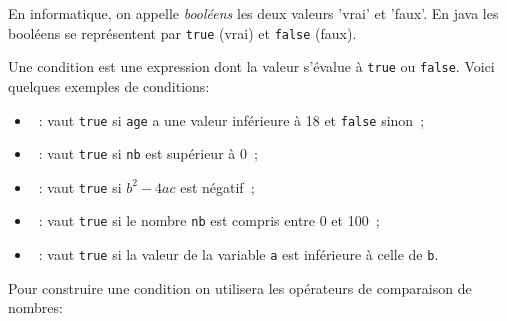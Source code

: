 \documentclass[a4paper,11pt]{article}
\begin{document}
	En informatique, on appelle \emph{booléens} les deux valeurs 'vrai' et 'faux'. 
	En java les booléens se représentent par \texttt{true} (vrai) et \texttt{false} (faux).  

	Une condition est une expression dont la valeur s'évalue à \texttt{true} ou \texttt{false}.
	Voici quelques exemples de conditions:
	\begin{itemize}
		\item {}~:  vaut \texttt{true} si \texttt{age} a une valeur inférieure à 18 et \texttt{false} sinon~;
		\item {}~:  vaut \texttt{true} si \texttt{nb} est supérieur à 0~;
		\item {}~: vaut \texttt{true} si $b^2-4ac$ est négatif~;
		\item {}~: vaut \texttt{true} si le nombre \texttt{nb} est compris entre 0 et 100~;
		\item {}~:  vaut \texttt{true} si la valeur de la variable \texttt{a} est inférieure à celle de \texttt{b}.
	\end{itemize}


	Pour construire une condition on utilisera les opérateurs de comparaison de nombres:
	
\end{document}

